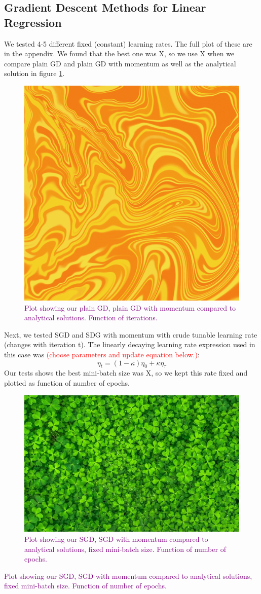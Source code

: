 \subsection{Gradient Descent Methods for Linear Regression}
We tested 4-5 different fixed (constant) learning rates. The full plot of these are in the appendix. We found that the best one was X, so we use X when we compare plain GD and plain GD with momentum as well as the analytical solution in figure \ref{fig:plainVSanalytical}.
\begin{figure}
    \centering
    \includegraphics[width=0.5\linewidth]{figures/placeholders/plainVSanalytical.png}
    \caption{\textcolor{purple}{Plot showing our plain GD, plain GD with momentum compared to analytical solutions. Function of iterations.}}
    \label{fig:plainVSanalytical}
\end{figure}

Next, we tested SGD and SDG with momentum with crude tunable learning rate (changes with iteration t). The linearly decaying learning rate expression used in this case was \textcolor{red}{(choose parameters and update equation below.)}:
\[
\eta_t = (1- \kappa)\eta_0 + \kappa \eta_\tau 
\]
Our tests shows the best mini-batch size was X, so we kept this rate fixed and plotted as function of number of epochs. 
\begin{figure}
    \centering
    \includegraphics[width=0.5\linewidth]{figures/placeholders/sgdVSanalytical.png}
    \caption{\textcolor{purple}{Plot showing our SGD, SGD with momentum  compared to analytical solutions, fixed mini-batch size. Function of number of epochs.}}
    \label{fig:sgdVSanalytical}
\end{figure}
\textcolor{purple}{Plot showing our SGD, SGD with momentum  compared to analytical solutions, fixed mini-batch size. Function of number of epochs.}

